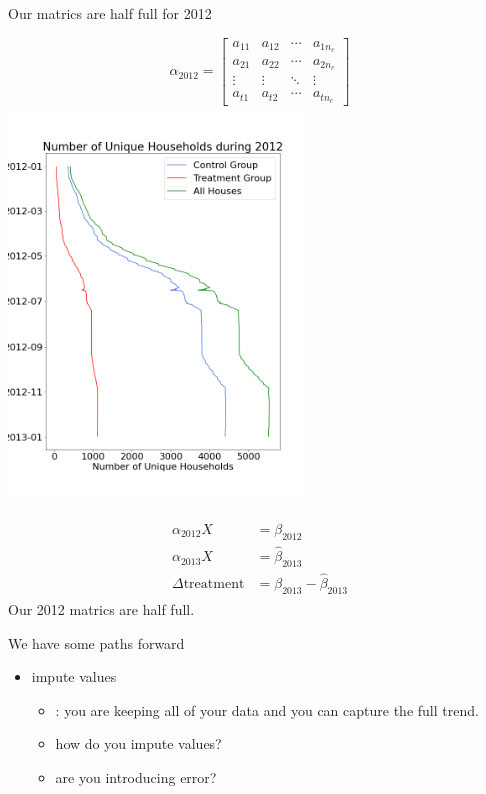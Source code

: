 \documentclass{beamer}
\begin{document}
\begin{frame}{Our matrics are half full for 2012}
  \begin{multicols}{2}
    $$
    \alpha_{2012} = \left[\begin{array}{cccc}
    a_{11} & a_{12} & \cdots & a_{1 n_c} \\
    a_{21} & a_{22} & \cdots & a_{2 n_c} \\
    \vdots & \vdots & \ddots & \vdots \\
    a_{t 1} & a_{t 2} & \cdots & a_{t n_c}
    \end{array}\right]
    $$
    \break
    \centering
    \includegraphics[width=0.6\textwidth]{images/unique-houses-2012.png}
  \end{multicols}
  \vspace{-1cm}
  \begin{align*}
    \begin{split}
        \alpha_{2012} X &= \beta_{2012} \\
        \alpha_{2013} X &= \hat\beta_{2013} \\
        \Delta\mbox{treatment} &= \beta_{2013} - \hat\beta_{2013}
    \end{split}
  \end{align*}
  Our 2012 matrics are half full.
\end{frame}

\begin{frame}{We have some paths forward}
  \begin{itemize}
    \item<+-> impute values
    \begin{itemize}
      \item<+-> {\color{green}{pro}}: you are keeping all of your data and you can capture the full trend.
      \item<+-> how do you impute values?
      \item<+-> are you introducing error?
    \end{itemize}
  \end{itemize}
\end{frame}
\end{document}
